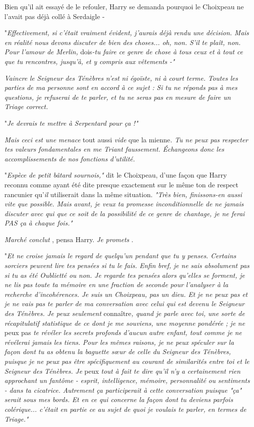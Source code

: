 Bien qu'il ait essayé de le refouler, Harry se demanda pourquoi le Choixpeau ne l'avait pas déjà collé à Serdaigle -

"\emph{Effectivement, si c'était vraiment évident, j'aurais déjà rendu une décision. Mais en réalité nous devons discuter de bien des choses... oh, non. S'il te plaît, non. Pour l'amour de Merlin, } dois\emph{-tu faire ce genre de chose à tous ceux et à tout ce que tu rencontres, jusqu'à, et y compris aux vêtements -"} 

\emph{Vaincre le Seigneur des Ténèbres n'est ni égoïste, ni à court terme. Toutes les parties de ma personne sont en accord à ce sujet : Si tu ne réponds pas à mes questions, je refuserai de te parler, et tu ne seras pas en mesure de faire un Triage correct.} 

"\emph{Je devrais te mettre à Serpentard pour ça !"} 

\emph{Mais ceci est une menace } tout aussi\emph{ vide } que la mienne\emph{. Tu ne peux pas respecter tes valeurs fondamentales en me Triant faussement. Échangeons donc les accomplissements de nos fonctions d'utilité.} 

"\emph{Espèce de petit bâtard sournois,"}  dit le Choixpeau, d'une façon que Harry reconnu comme ayant été dite presque exactement sur le même ton de respect rancunier qu'\emph{il}  utiliserait dans la même situation. \emph{"Très bien, finissons-en aussi vite que possible. Mais avant, je veux ta promesse inconditionnelle de ne jamais discuter avec qui que ce soit de la possibilité de ce genre de chantage, je ne ferai PAS ça à chaque fois."} 

\emph{Marché conclut} , pensa Harry. \emph{Je promets} .

"\emph{Et ne croise jamais le regard de quelqu'un pendant que tu y penses. Certains sorciers peuvent lire tes pensées si tu le fais. Enfin bref, je ne sais absolument pas si tu as été Oublietté ou non. Je regarde tes pensées alors qu'elles se forment, je ne lis pas toute ta mémoire en une fraction de seconde pour l'analyser à la recherche d'incohérences. Je suis un Choixpeau, pas un dieu. Et je ne peux pas et je ne vais pas te parler de ma conversation avec celui qui est devenu le Seigneur des Ténèbres. Je peux seulement } connaître\emph{, quand je parle avec toi, une sorte de récapitulatif statistique de ce dont je me souviens, une moyenne pondérée ; je ne } peux pas \emph{te révéler les secrets profonds d'aucun autre enfant, tout comme je ne révélerai jamais les tiens. Pour les mêmes raisons, je ne peux spéculer sur la façon dont tu as obtenu la baguette sœur de celle du Seigneur des Ténèbres, puisque je ne peux pas être spécifiquement au courant de similarités entre toi et le Seigneur des Ténèbres. Je } peux\emph{ tout à fait te dire qu'il n'y a certainement rien approchant un fantôme - esprit, intelligence, mémoire, personnalité ou sentiments - dans ta cicatrice. Autrement ça participerait à cette conversation puisque "ça" serait sous mes bords. Et en ce qui concerne la façon dont tu deviens parfois colérique... c'était en partie ce au sujet de quoi je voulais te parler, en termes de Triage."} 


